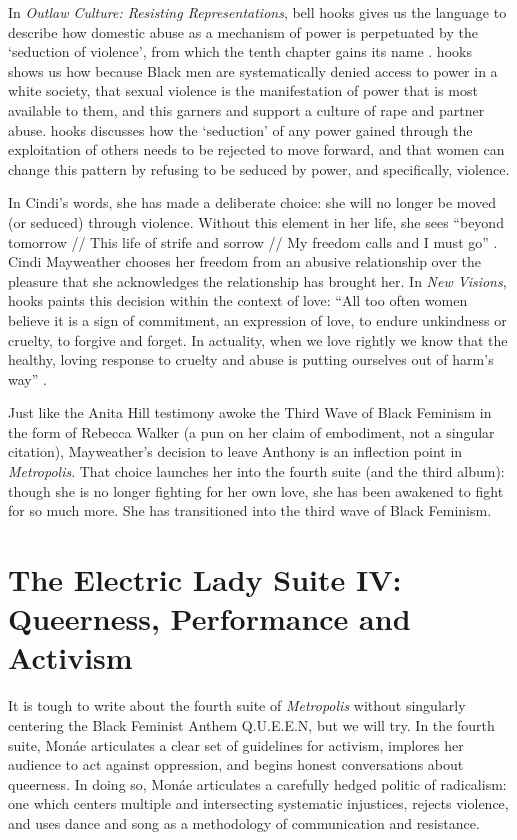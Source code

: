 \documentclass[a4paper, 11pt]{article} %
\begin{document}
In \emph{Outlaw Culture: Resisting Representations}, bell hooks gives us the language to describe how domestic abuse as a mechanism of power is perpetuated by the `seduction of violence', from which the tenth chapter gains its name \cite{hooks1994outlaw}.
hooks shows us how because Black men are systematically denied access to power in a white society, that sexual violence is the manifestation of power that is most available to them, and this garners and support a culture of rape and partner abuse.
hooks discusses how the `seduction' of any power gained through the exploitation of others needs to be rejected to move forward, and that women can change this pattern by refusing to be seduced by power, and specifically, violence.


In Cindi's words, she has made a deliberate choice: she will no longer be moved (or seduced) through violence. 
Without this element in her life, she sees ``beyond tomorrow // This life of strife and sorrow // My freedom calls and I must go'' \cite{babopbyeya}.
Cindi Mayweather chooses her freedom from an abusive relationship over the pleasure that she acknowledges the relationship has brought her.
In \emph{New Visions}, hooks paints this decision within the context of love: ``All too often women believe it is a sign of commitment, an expression of love, to endure unkindness or cruelty, to forgive and forget. In actuality, when we love rightly we know that the healthy, loving response to cruelty and abuse is putting ourselves out of harm's way'' \cite{newvisions}.

Just like the Anita Hill testimony awoke the Third Wave of Black Feminism in the form of Rebecca Walker \cite{rebeccawalker} (a pun on her claim of embodiment, not a singular citation), Mayweather's decision to leave Anthony is an inflection point in \emph{Metropolis}.
That choice launches her into the fourth suite (and the third album): though she is no longer fighting for her own love, she has been awakened to fight for so much more. 
She has transitioned into the third wave of Black Feminism.



\section*{The Electric Lady Suite IV: Queerness, Performance and Activism}

It is tough to write about the fourth suite of \emph{Metropolis} without singularly centering the Black Feminist Anthem Q.U.E.E.N, but we will try.
In the fourth suite, Mon\'ae articulates a clear set of guidelines for activism, implores her audience to act against oppression, and begins honest conversations about queerness.
In doing so, Mon\'ae articulates a carefully hedged politic of radicalism: one which centers multiple and intersecting systematic injustices, rejects violence, and uses dance and song as a methodology of communication and resistance.
\end{document}
